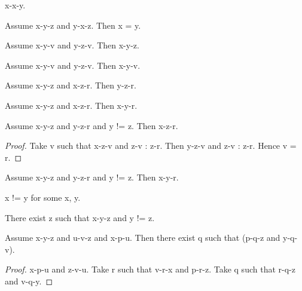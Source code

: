 \documentclass{article}
\begin{document}
\begin{forthel}
    \begin{lemma}[L3_3]
      x-x-y.
    \end{lemma}

    \begin{lemma}[L3_4]
      Assume x-y-z and y-x-z. Then x = y.
    \end{lemma}

    \begin{lemma}[L3_5a]
      Assume x-y-v and y-z-v. Then x-y-z.
    \end{lemma}

    \begin{lemma}[L3_5b]
      Assume x-y-v and y-z-v. Then x-y-v.
    \end{lemma}

    \begin{lemma}[L3_6a]
      Assume x-y-z and x-z-r. Then y-z-r.
    \end{lemma}

    \begin{lemma}[L3_6b]
      Assume x-y-z and x-z-r. Then x-y-r.
    \end{lemma}

    \begin{lemma}[L3_7a]
      Assume x-y-z and y-z-r and y != z. Then x-z-r.
    \end{lemma}
    \begin{proof}
    	Take v such that x-z-v and z-v : z-r.
    	Then y-z-v and z-v : z-r. Hence v = r.
    \end{proof}

    \begin{lemma}[L3_7b]
      Assume x-y-z and y-z-r and y != z. Then x-y-r.
    \end{lemma}

    \begin{lemma}[L3_13]
      x != y for some x, y.
    \end{lemma}

    \begin{lemma}[L3_14]
      There exist z such that x-y-z and y != z.
    \end{lemma}


    \begin{lemma}[L3_17]
      Assume x-y-z and u-v-z and x-p-u. Then there exist q such that (p-q-z and
      y-q-v).
    \end{lemma}
    \begin{proof}
      x-p-u and z-v-u.
    	Take r such that v-r-x and p-r-z. %
    	Take q such that r-q-z and v-q-y. %
    \end{proof}



\end{forthel}
\end{document}
